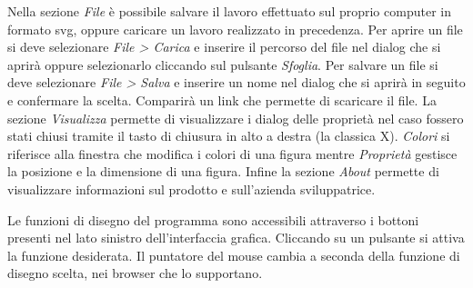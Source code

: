 Nella sezione \textit{File} \`e possibile salvare il lavoro effettuato sul proprio computer in formato svg, oppure caricare un lavoro realizzato in precedenza.
Per aprire un file si deve selezionare \textit{File > Carica} e inserire il percorso del file nel dialog che si aprir\`a oppure selezionarlo cliccando sul pulsante \textit{Sfoglia}. 
Per salvare un file si deve selezionare \textit{File > Salva} e inserire un nome nel dialog che si aprir\`a in seguito e confermare la scelta. Comparir\`a un link che permette di scaricare il file.
La sezione \textit{Visualizza} permette di visualizzare i dialog delle propriet\`a nel caso fossero stati chiusi tramite il tasto di chiusura in alto a destra (la classica X). \textit{Colori} si riferisce alla finestra che modifica i colori di una figura mentre \textit{Propriet\`a} gestisce la posizione e la dimensione di una figura.
Infine la sezione \textit{About} permette di visualizzare informazioni sul prodotto e sull'azienda sviluppatrice.

Le funzioni di disegno del programma sono accessibili attraverso i bottoni presenti nel lato sinistro dell'interfaccia grafica. Cliccando su un pulsante si attiva la funzione desiderata. Il puntatore del mouse cambia a seconda della funzione di disegno scelta, nei browser che lo supportano.

